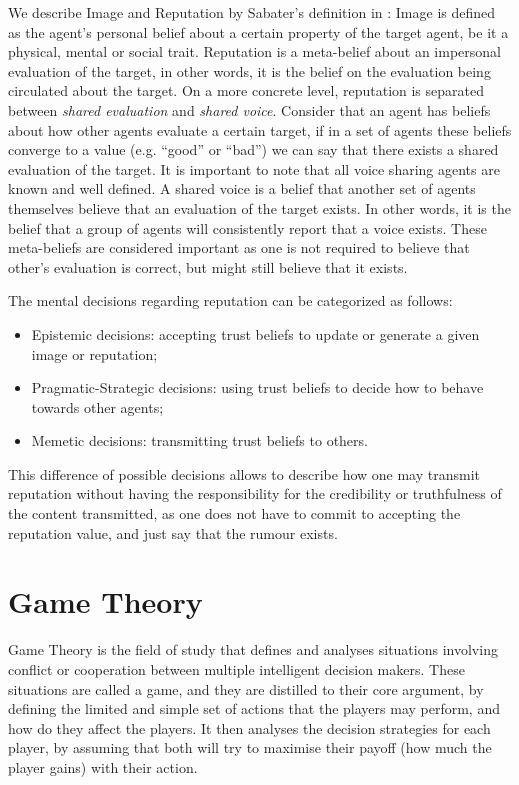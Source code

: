 We describe Image and Reputation by Sabater's definition in \cite{Sabater2006}:
Image is defined as the agent's personal belief about a certain property of the target agent, be it a physical, mental or social trait. Reputation is a meta-belief about an impersonal evaluation of the target, in other words, it is the belief on the evaluation being circulated about the target. On a more concrete level, reputation is separated between \textit{shared evaluation} and \textit{shared voice}. Consider that an agent has beliefs about how other agents evaluate a certain target, if in a set of agents these beliefs converge to a value (e.g. ``good'' or ``bad'') we can say that there exists a shared evaluation of the target. It is important to note that all voice sharing agents are known and well defined. A shared voice is a belief that another set of agents themselves believe that an evaluation of the target exists. In other words, it is the belief that a group of agents will consistently report that a voice exists. These meta-beliefs are considered important as one is not required to believe that other's evaluation is correct, but might still believe that it exists.

The mental decisions regarding reputation can be categorized as follows:
\begin{itemize}
    \item Epistemic decisions: accepting trust beliefs to update or generate a given image or reputation;
    \item Pragmatic-Strategic decisions: using trust beliefs to decide how to behave towards other agents;
    \item Memetic decisions: transmitting trust beliefs to others. 
\end{itemize}
This difference of possible decisions allows to describe how one may transmit reputation without having the responsibility for the credibility or truthfulness of the content transmitted, as one does not have to commit to accepting the reputation value, and just say that the rumour exists.


\section{Game Theory}
\label{sec:GameTheory}
Game Theory is the field of study that defines and analyses situations involving conflict or cooperation between multiple intelligent decision makers. These situations are called a game, and they are distilled to their core argument, by defining the limited and simple set of actions that the players may perform, and how do they affect the players. It then analyses the decision strategies for each player, by assuming that both will try to maximise their payoff (how much the player gains) with their action.


